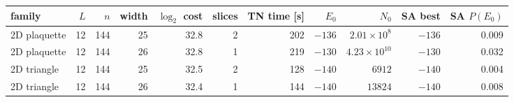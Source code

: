 \begin{tabular}{lrr rrr r rr rr}
\toprule
family & $L$ & $n$ & width & $\log_2$ cost & slices & TN time [s] & $E_0$ & $N_0$ & SA best & SA $P(E_0)$ \\
\midrule
2D plaquette & 12 & 144 & 25 & 32.8 & 2 & 202 & $-136$ & $2.01\times 10^{8}$ & $-136$ & 0.009 \\
2D plaquette & 12 & 144 & 26 & 32.8 & 1 & 219 & $-130$ & $4.23\times 10^{10}$ & $-130$ & 0.032 \\
2D triangle & 12 & 144 & 25 & 32.5 & 2 & 128 & $-140$ & $6912$ & $-140$ & 0.004 \\
2D triangle & 12 & 144 & 26 & 32.4 & 1 & 144 & $-140$ & $13824$ & $-140$ & 0.008 \\
\bottomrule
\end{tabular}